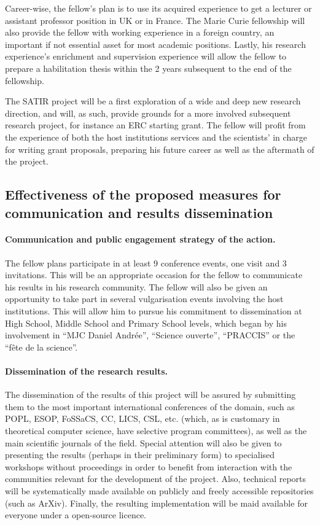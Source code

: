 \documentclass{article}[11pt]
\begin{document}
Career-wise, the fellow’s plan is to use its acquired experience to get a lecturer or assistant professor position in UK or in France. The Marie Curie fellowship will also provide the fellow with working experience in a foreign country, an important if not essential asset for most academic positions.  Lastly, his research experience’s enrichment and supervision experience will allow the fellow to prepare a habilitation thesis within the 2 years subsequent to the end of the fellowship.

The SATIR project will be a first exploration of a wide and deep new research direction, and will, as such, provide grounds for a more involved subsequent research project, for instance an ERC starting grant. The fellow will profit from the experience of both the host institutions services and the scientists’ in charge for writing grant proposals, preparing his future career as well as the aftermath of the project.



\subsection{Effectiveness of the proposed measures for communication and results dissemination}

\paragraph{Communication and public engagement strategy of the action.} 
The fellow plans participate in at least 9 conference events, one visit and 3 invitations. This will be an appropriate occasion for the fellow to communicate his results in his research community. The fellow will also be given an opportunity to take part in several vulgarisation events involving the host institutions. This will allow him to pursue his commitment to dissemination at High School, Middle School and Primary School levels, which began by his involvement in “MJC Daniel Andrée”, ``Science ouverte'', ``PRACCIS'' or the “fête de la science”.


\paragraph{Dissemination of the research results.} 
The dissemination of the results of this project will be assured by submitting them to the most important international conferences of the domain, such as POPL, ESOP, FoSSaCS, CC, LICS, CSL, etc. (which, as is customary in theoretical computer science, have selective program committees), as well as the main scientific journals of the field. Special attention will also be given to presenting the results (perhaps in their preliminary form) to specialised workshops without proceedings in order to benefit from interaction with the communities relevant for the development of the project. Also, technical reports will be systematically made available on publicly and freely accessible repositories (such as ArXiv). Finally, the resulting implementation will be maid available for everyone under a open-source licence.
\end{document}
